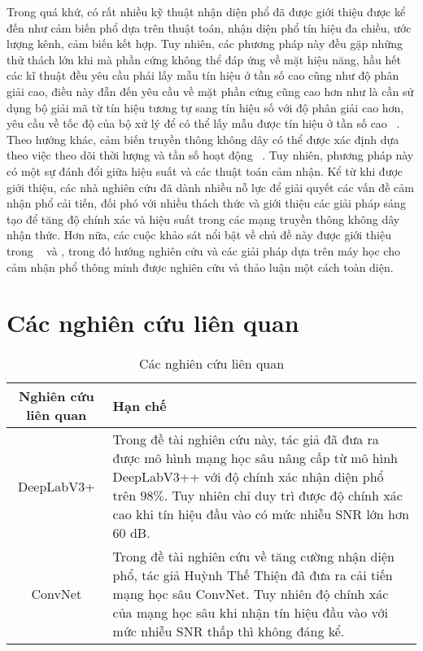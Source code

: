 Trong quá khứ, có rất nhiều kỹ thuật nhận diện phổ đã được giới thiệu được kể đến như cảm biến phổ dựa trên thuật toán, nhận diện phổ tín hiệu đa chiều, ước lượng kênh, cảm biến kết hợp. Tuy nhiên, các phương pháp này đều gặp những thử thách lớn khi mà phần cứng không thể đáp ứng về mặt hiệu năng, hầu hết các kĩ thuật đều yêu cầu phải lấy mẫu tín hiệu ở tần số cao cũng như độ phân giải cao, điều này đẫn đến yêu cầu về mặt phần cứng cũng cao hơn như là cần sử dụng bộ giải mã từ tín hiệu tương tự sang tín hiệu số với độ phân giải cao hơn, yêu cầu về tốc độ của bộ xử lý để có thể lấy mẫu được tín hiệu ở tần số cao ~\cite{YucekSpectrumSensing}. Theo hướng khác, cảm biến truyền thông không dây có thể được xác định dựa theo việc theo dõi thời lượng và tần số hoạt động ~\cite{kumar2024analysis}. Tuy nhiên, phương pháp này có một sự đánh đổi giữa hiệu suất và các thuật toán cảm nhận. Kể từ khi được giới thiệu, các nhà nghiên cứu đã dành nhiều nỗ lực để giải quyết các vấn đề cảm nhận phổ cải tiến, đối phó với nhiều thách thức và giới thiệu các giải pháp sáng tạo để tăng độ chính xác và hiệu suất trong các mạng truyền thông không dây nhận thức. Hơn nữa, các cuộc khảo sát nổi bật về chủ đề này được giới thiệu trong ~\cite{ali2016advances} và \cite{liyanaarachchi2021optimized}, trong đó hướng nghiên cứu và các giải pháp dựa trên máy học cho cảm nhận phổ thông minh được nghiên cứu và thảo luận một cách toàn diện.




\section{Các nghiên cứu liên quan}

\begin{table}[h!]
    \centering
    \begin{tabular}{c|p{8cm}}
        \hline
        \hline
        \textbf{Nghiên cứu liên quan}  & \textbf{Hạn chế} \\
        \hline
        DeepLabV3+ \cite{nguyen2023accurate} & Trong đề tài nghiên cứu này, tác giả đã đưa ra được mô hình mạng học sâu nâng cấp từ mô hình DeepLabV3++ với độ chính xác nhận diện phổ trên $98\%$. Tuy nhiên chỉ duy trì được độ chính xác cao khi tín hiệu đầu vào có mức nhiễu SNR lớn hơn $60$ dB. \\
        \hline
        ConvNet \cite{huynhthe2023intelligence} & Trong đề tài nghiên cứu về tăng cường nhận diện phổ, tác giả Huỳnh Thế Thiện đã đưa ra cải tiến mạng học sâu ConvNet. Tuy nhiên độ chính xác của mạng học sâu khi nhận tín hiệu đầu vào với mức nhiễu SNR thấp thì không đáng kể. \\
        \hline
        \hline
    \end{tabular}
    \caption{Các nghiên cứu liên quan}
    \label{table:relatedResearch}
\end{table}

